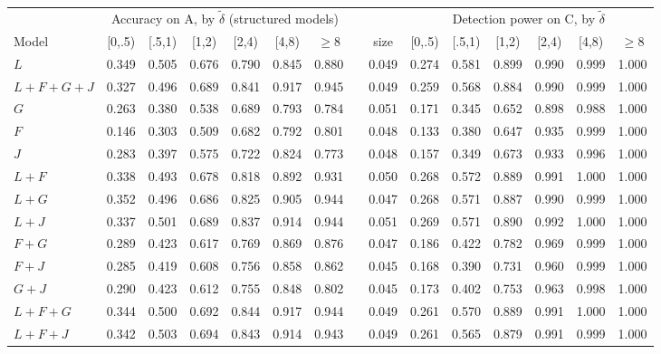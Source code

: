 \documentclass[10pt,a4paper]{article}
\newcommand{\dtil}{\tilde\delta}
\begin{document}
\begin{table}[ht]
\centering\footnotesize\setlength{\tabcolsep}{3.5pt}
\begin{tabular}{@{}l cccccc c c cccccc@{}}
\toprule
 & \multicolumn{6}{c}{Accuracy on A, by $\dtil$ (structured models)} & & & \multicolumn{6}{c}{Detection power on C, by $\dtil$}\\
\cmidrule(lr){2-7}\cmidrule(l){10-15}
Model & [0,.5) & [.5,1) & [1,2) & [2,4) & [4,8) & $\ge$8 & & size & [0,.5) & [.5,1) & [1,2) & [2,4) & [4,8) & $\ge$8\\
\midrule
$L$ & 0.349 & 0.505 & 0.676 & 0.790 & 0.845 & 0.880 & & 0.049 & 0.274 & 0.581 & 0.899 & 0.990 & 0.999 & 1.000\\
$L{+}F{+}G{+}J$ & 0.327 & 0.496 & 0.689 & 0.841 & 0.917 & 0.945 & & 0.049 & 0.259 & 0.568 & 0.884 & 0.990 & 0.999 & 1.000\\
$G$ & 0.263 & 0.380 & 0.538 & 0.689 & 0.793 & 0.784 & & 0.051 & 0.171 & 0.345 & 0.652 & 0.898 & 0.988 & 1.000\\
$F$ & 0.146 & 0.303 & 0.509 & 0.682 & 0.792 & 0.801 & & 0.048 & 0.133 & 0.380 & 0.647 & 0.935 & 0.999 & 1.000\\
$J$ & 0.283 & 0.397 & 0.575 & 0.722 & 0.824 & 0.773 & & 0.048 & 0.157 & 0.349 & 0.673 & 0.933 & 0.996 & 1.000\\
$L{+}F$ & 0.338 & 0.493 & 0.678 & 0.818 & 0.892 & 0.931 & & 0.050 & 0.268 & 0.572 & 0.889 & 0.991 & 1.000 & 1.000\\
$L{+}G$ & 0.352 & 0.496 & 0.686 & 0.825 & 0.905 & 0.944 & & 0.047 & 0.268 & 0.571 & 0.887 & 0.990 & 0.999 & 1.000\\
$L{+}J$ & 0.337 & 0.501 & 0.689 & 0.837 & 0.914 & 0.944 & & 0.051 & 0.269 & 0.571 & 0.890 & 0.992 & 1.000 & 1.000\\
$F{+}G$ & 0.289 & 0.423 & 0.617 & 0.769 & 0.869 & 0.876 & & 0.047 & 0.186 & 0.422 & 0.782 & 0.969 & 0.999 & 1.000\\
$F{+}J$ & 0.285 & 0.419 & 0.608 & 0.756 & 0.858 & 0.862 & & 0.045 & 0.168 & 0.390 & 0.731 & 0.960 & 0.999 & 1.000\\
$G{+}J$ & 0.290 & 0.423 & 0.612 & 0.755 & 0.848 & 0.802 & & 0.045 & 0.173 & 0.402 & 0.753 & 0.963 & 0.998 & 1.000\\
$L{+}F{+}G$ & 0.344 & 0.500 & 0.692 & 0.844 & 0.917 & 0.944 & & 0.049 & 0.261 & 0.570 & 0.889 & 0.991 & 1.000 & 1.000\\
$L{+}F{+}J$ & 0.342 & 0.503 & 0.694 & 0.843 & 0.914 & 0.943 & & 0.049 & 0.261 & 0.565 & 0.879 & 0.991 & 0.999 & 1.000\\

\end{tabular}
\end{table}
\end{document}
